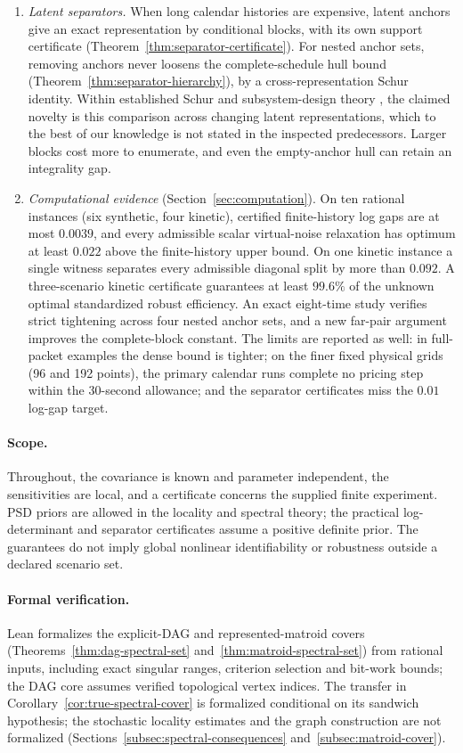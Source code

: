 \begin{enumerate}
\item \emph{Latent separators.} When long calendar histories are expensive,
latent anchors give an exact representation by conditional blocks, with its
own support certificate (Theorem~\ref{thm:separator-certificate}). For
nested anchor sets, removing anchors never loosens the complete-schedule
hull bound (Theorem~\ref{thm:separator-hierarchy}), by a cross-representation
Schur identity. Within established Schur and subsystem-design theory
\citep{Sagnol2015}, the claimed novelty is this comparison across changing
latent representations, which to the best of our knowledge is not stated in
the inspected predecessors. Larger blocks cost more to enumerate, and even the
empty-anchor hull can retain an integrality gap.

\item \emph{Computational evidence} (Section~\ref{sec:computation}). On ten
rational instances (six synthetic, four kinetic), certified finite-history
log gaps are at most $0.0039$, and every admissible scalar virtual-noise
relaxation has optimum at least $0.022$ above the finite-history upper
bound. On one kinetic instance a single witness separates every admissible
diagonal split by more than $0.092$. A three-scenario kinetic certificate
guarantees at least $99.6\%$ of the unknown optimal standardized robust
efficiency. An exact eight-time study verifies strict tightening across four
nested anchor sets, and a new far-pair argument improves the complete-block
constant. The limits are reported as well: in full-packet examples the dense
bound is tighter; on the finer fixed physical grids (96 and 192 points),
the primary calendar runs complete no pricing step within the 30-second allowance; and the
separator certificates miss the $0.01$ log-gap target.
\end{enumerate}

\paragraph{Scope.}
Throughout, the covariance is known and parameter independent, the
sensitivities are local, and a certificate concerns the supplied finite
experiment. PSD priors are allowed in the locality and spectral theory; the
practical log-determinant and separator certificates assume a positive
definite prior. The guarantees do not imply global nonlinear
identifiability or robustness outside a declared scenario set.

\paragraph{Formal verification.}
Lean formalizes the explicit-DAG and represented-matroid covers
(Theorems~\ref{thm:dag-spectral-set} and~\ref{thm:matroid-spectral-set})
from rational inputs, including exact singular ranges, criterion selection
and bit-work bounds; the DAG core assumes verified topological vertex
indices. The transfer in Corollary~\ref{cor:true-spectral-cover} is
formalized conditional on its sandwich hypothesis; the stochastic locality
estimates and the graph construction are not formalized
(Sections~\ref{subsec:spectral-consequences} and~\ref{subsec:matroid-cover}).

